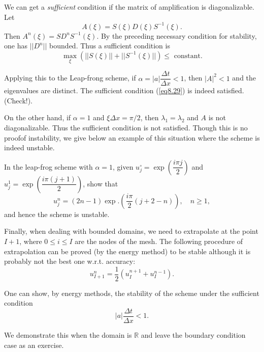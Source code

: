 We can get a {\em sufficient} condition if the matrix of amplification is diagonalizable. Let
$$
A(\xi) = S(\xi) D(\xi) S^{-1} (\xi). 
$$
Then $A^n(\xi) = SD^n S^{-1} (\xi)$. By the preceding necessary condition for stability, one has $||D^n||$ bounded. Thus a sufficient condition is 
\begin{equation*}
\max\limits_{\xi} (||S(\xi)|| + ||S^{-1} (\xi)||)  \leq \text{ constant}. \tag{8.29} \label{eq8.29}
\end{equation*}

Applying this to the Leap-frong scheme, if $\alpha = |a| \dfrac{\Delta t}{\Delta x} < 1$, then $|A|^2 < 1$ and the eigenvalues are distinct. The sufficient condition (\ref{eq8.29}) is indeed satisfied. (Check!).

On the other hand, if $\alpha =1$ and $\xi \Delta x = \pi/2$, then $\lambda_1 = \lambda_2$ and $A$ is not diagonalizable. Thus the sufficient condition is not satisfied. Though this is no proof\pageoriginale of instability, we give below an example of this situation where the scheme is indeed unstable.

\begin{exercise}\label{chap8:exer8.5}
In the leap-frog scheme with $\alpha =1$, given $u^\circ_j = \exp
\left(\dfrac{i\pi j}{2}\right)$ and $u^1_j = \exp
\left(\dfrac{i\pi(j+1)}{2}\right)$, show that 
$$
u^n_j = (2n-1) \exp. \left(\frac{i\pi}{2} (j+2 - n)\right), \quad n \geq 1,
$$
and hence the scheme is unstable.
\end{exercise}

Finally, when dealing with bounded domains, we need to extrapolate at the point $I+1$, where $0 \leq i \leq I$  are the nodes of the mesh. The following procedure of extrapolation can be proved (by the energy method) to be stable although it is probably not the best one w.r.t. accuracy:
\begin{equation*}
u^n_{I+1} = \frac{1}{2} (u^{n+1}_I + u^{n-1}_I). \tag{8.30}\label{eq8.30}
\end{equation*}

One can show, by energy methods, the stability of the scheme under the sufficient condition
\begin{equation*}
|a| \frac{\Delta t}{\Delta x} < 1. \tag{8.31}\label{eq8.31}
\end{equation*}

We demonstrate this when the domain is $\mathbb{R}$ and leave the boundary condition case as an exercise.

